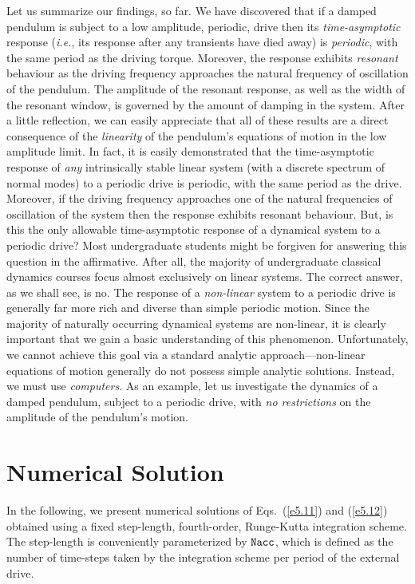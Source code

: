 Let us summarize our findings, so far. We have discovered that if a damped pendulum is
subject to a low amplitude, periodic, drive then its {\em time-asymptotic} response ({\em i.e.},
its response after any transients have died away) is {\em periodic}, with the same period
as the driving torque. Moreover, the response exhibits {\em resonant} behaviour as the driving
frequency approaches the natural frequency of oscillation of the pendulum. The amplitude
of the resonant response, as well as the width of the resonant window, is governed by the
amount of damping in the system. After a little reflection, we can easily appreciate that
all of these results are a direct consequence of the {\em linearity} of the pendulum's
equations of  motion in the low amplitude limit. In fact, 
it is easily demonstrated that the time-asymptotic response of {\em any} intrinsically
stable linear system (with a discrete spectrum of normal modes) to a periodic drive is periodic,
with the same period as the drive. Moreover, if the driving frequency approaches
one of the natural frequencies of oscillation of the system then the response exhibits
resonant behaviour. But, is this the only allowable time-asymptotic response of a dynamical system to a
periodic drive? Most undergraduate students might be forgiven for answering this question
in the affirmative. After all, the majority of undergraduate classical dynamics courses focus almost
exclusively on linear systems. The correct answer, as we shall see, is no. The response of
a {\em non-linear} system to a periodic drive is generally far more rich and
diverse than simple periodic motion. Since the majority of naturally
occurring dynamical systems are non-linear, it is clearly important that we gain a
basic understanding of this phenomenon. Unfortunately, we cannot achieve this goal via
a standard analytic approach---non-linear equations of motion generally do not possess
simple analytic solutions. Instead, we must use {\em computers}. As an example, let us
investigate the dynamics of a damped pendulum, subject to a periodic drive, with {\em no
restrictions} on the amplitude of the pendulum's motion.

\section{Numerical Solution}
In the following, we present numerical solutions of Eqs.~(\ref{e5.11}) and (\ref{e5.12})
obtained using a fixed step-length, fourth-order,
Runge-Kutta integration scheme. The step-length is conveniently parameterized by
${\tt Nacc}$, which is defined as the number of time-steps taken by the integration
scheme per period of the external drive.


